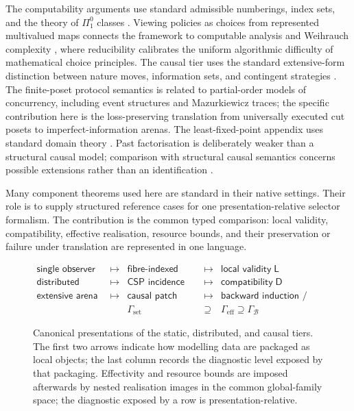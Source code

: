 \documentclass[11pt]{article}
\theoremstyle{plain}
\theoremstyle{definition}
\theoremstyle{remark}
\begin{document}
The computability arguments use standard admissible numberings, index sets, and
the theory of $\Pi^0_1$ classes \cite{kleene,jockuschsoare,rogers,soare}. Viewing
policies as choices from represented multivalued maps connects the framework to
computable analysis and Weihrauch complexity \cite{brattkagherardi,weihrauch},
where reducibility calibrates the uniform algorithmic difficulty of mathematical
choice principles. The causal tier uses the standard extensive-form distinction
between nature moves, information sets, and contingent strategies
\cite{osbornerubinstein}. The finite-poset protocol semantics is related to
partial-order models of concurrency, including event structures and Mazurkiewicz
traces; the specific contribution here is the loss-preserving translation from
universally executed cut posets to imperfect-information arenas. The
least-fixed-point appendix uses standard domain theory \cite{abramskyjung}. Past
factorisation is deliberately weaker than a structural causal model; comparison
with structural causal semantics concerns possible extensions rather than an
identification \cite{pearl}.

Many component theorems used here are standard in their native settings. Their
role is to supply structured reference cases for one presentation-relative
selector formalism. The contribution is the common typed comparison: local
validity, compatibility, effective realisation, resource bounds, and their
preservation or failure under translation are represented in one language.

\begin{figure}[htbp]
\centering
\[
\begin{array}{rclcl}
\textsf{single observer}
&\longmapsto&
\textsf{fibre-indexed selector}
&\longmapsto&
\textsf{local validity}\;\mathsf L
\\[1mm]
\textsf{distributed observers}
&\longmapsto&
\textsf{CSP incidence diagram}
&\longmapsto&
\textsf{compatibility}\;\mathsf D
\\[1mm]
\textsf{extensive arena}
&\longmapsto&
\textsf{causal patch sheaf}
&\longmapsto&
\textsf{backward induction / matching}
\\[2mm]
&&
\Gamma_{\mathrm{set}}
&\supseteq&
\Gamma_{\mathrm{eff}}\supseteq\Gamma_{\mathcal B}
\end{array}
\]
\caption{Canonical presentations of the static, distributed, and causal tiers.
The first two arrows indicate how modelling data are packaged as local objects;
the last column records the diagnostic level exposed by that packaging.
Effectivity and resource bounds are imposed afterwards by nested realisation
images in the common global-family space; the diagnostic exposed by a row is
presentation-relative.}
\label{fig:architecture}
\end{figure}
\end{document}

